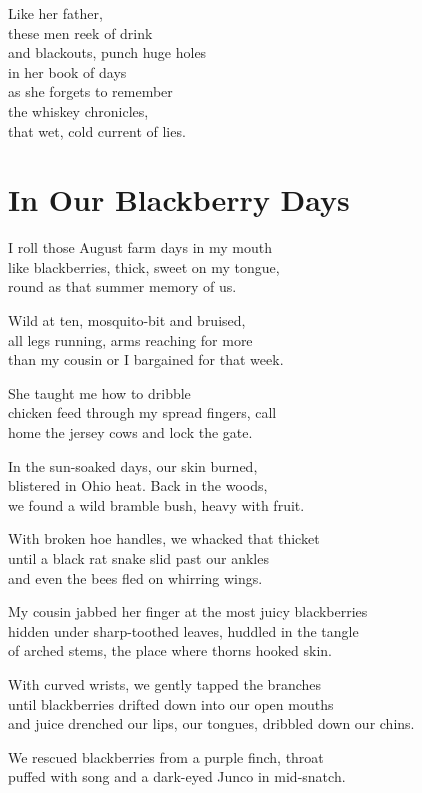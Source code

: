 \documentclass[twoside,10pt]{book}
\begin{document}
Like her father,\\
these men reek of drink\\
and blackouts, punch huge holes\\
in her book of days\\
as she forgets to remember\\
the whiskey chronicles,\\
that wet, cold current of lies.


\clearpage
\section{In Our Blackberry Days}

I roll those August farm days in my mouth\\
like blackberries, thick, sweet on my tongue,\\
round as that summer memory of us.

Wild at ten, mosquito-bit and bruised,\\
all legs running, arms reaching for more\\
than my cousin or I bargained for that week.

She taught me how to dribble\\
chicken feed through my spread fingers, call\\
home the jersey cows and lock the gate.

In the sun-soaked days, our skin burned,\\
blistered in Ohio heat. Back in the woods,\\
we found a wild bramble bush, heavy with fruit.

With broken hoe handles, we whacked that thicket\\
until a black rat snake slid past our ankles\\
and even the bees fled on whirring wings.

My cousin jabbed her finger at the most juicy blackberries\\
hidden under sharp-toothed leaves, huddled in the tangle\\
of arched stems, the place where thorns hooked skin.

With curved wrists, we gently tapped the branches\\
until blackberries drifted down into our open mouths\\
and juice drenched our lips, our tongues, dribbled down our chins.

We rescued blackberries from a purple finch, throat\\
puffed with song and a dark-eyed Junco in mid-snatch.
\end{document}
